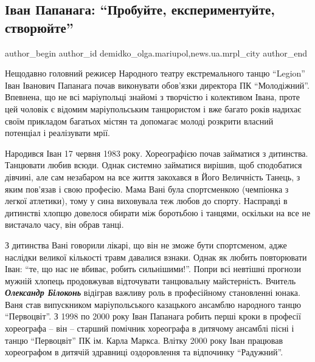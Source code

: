  
 
 
 
 
 
\subsection{Іван Папанага: \enquote{Пробуйте, експериментуйте, створюйте}}
\label{sec:21_04_2021.stz.news.ua.mrpl_city.1.ivan_papanaga}
 
\ifcmt
 author_begin
   author_id demidko_olga.mariupol,news.ua.mrpl_city
 author_end
\fi


Нещодавно головний режисер Народного театру екстремального танцю \enquote{Legion} Іван
Іванович Папанага почав виконувати обов'язки директора ПК \enquote{Молодіжний}.
Впевнена, що не всі маріупольці знайомі з творчістю і колективом Івана, проте
цей чоловік є відомим маріупольським танцюристом і вже багато років надихає
своїм прикладом багатьох містян та допомагає молоді розкрити власний потенціал
і реалізувати мрії.

Народився Іван 17 червня 1983 року. Хореографією почав займатися з дитинства.
Танцювати любив всюди. Однак системно займатися вирішив, щоб сподобатися
дівчині, але сам незабаром на все життя закохався в Його Величність Танець, з
яким пов'язав і свою професію. Мама Вані була спортсменкою (чемпіонка з легкої
атлетики), тому у сина виховувала теж любов до спорту. Насправді в дитинстві
хлопцю довелося обирати між боротьбою і танцями, оскільки на все не вистачало
часу, він обрав танці. 


З дитинства Вані говорили лікарі, що він не зможе бути
спортсменом, адже наслідки великої кількості травм давалися взнаки. Однак як
любить повторювати Іван: \enquote{те, що нас не вбиває, робить сильнішими!}. Попри всі
невтішні прогнози мужній хлопець продовжував відточувати танцювальну
майстерність.  Вчитель \emph{\textbf{Олександр Білоконь}} відіграв важливу роль в професійному
становленні юнака. Ваня став випускником маріупольського казацького ансамблю
народного танцю \enquote{Первоцвіт}. З 1998 по 2000 року Іван Папанага робить перші
кроки в професії хореографа – він – старший помічник хореографа в дитячому
ансамблі пісні і танцю \enquote{Первоцвіт} ПК ім. Карла Маркса. Влітку 2000 року Іван
працював хореографом в дитячій здравниці оздоровлення та відпочинку \enquote{Радужний}.

